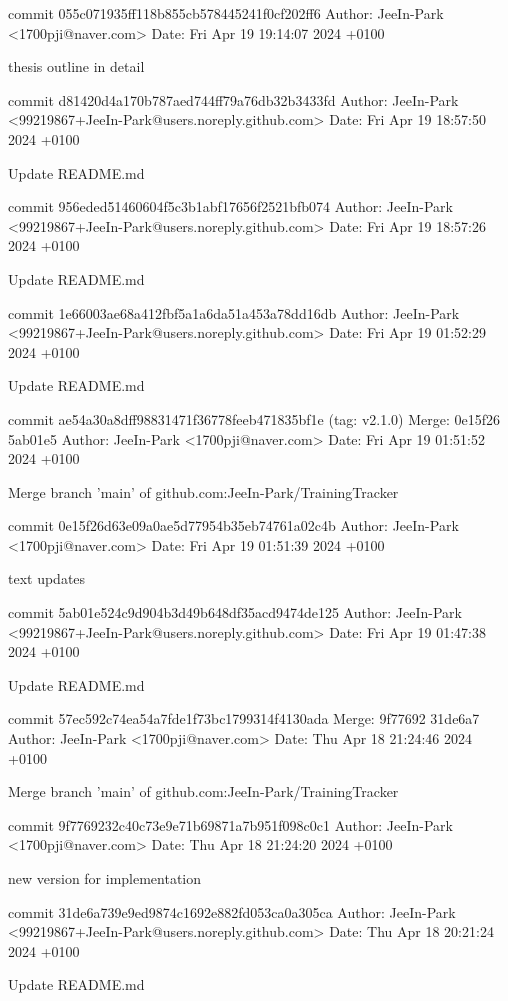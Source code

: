 

commit 055c071935ff118b855cb578445241f0cf202ff6
Author: JeeIn-Park <1700pji@naver.com>
Date:   Fri Apr 19 19:14:07 2024 +0100

    thesis outline in detail

commit d81420d4a170b787aed744ff79a76db32b3433fd
Author: JeeIn-Park <99219867+JeeIn-Park@users.noreply.github.com>
Date:   Fri Apr 19 18:57:50 2024 +0100

    Update README.md

commit 956eded51460604f5c3b1abf17656f2521bfb074
Author: JeeIn-Park <99219867+JeeIn-Park@users.noreply.github.com>
Date:   Fri Apr 19 18:57:26 2024 +0100

    Update README.md

commit 1e66003ae68a412fbf5a1a6da51a453a78dd16db
Author: JeeIn-Park <99219867+JeeIn-Park@users.noreply.github.com>
Date:   Fri Apr 19 01:52:29 2024 +0100

    Update README.md

commit ae54a30a8dff98831471f36778feeb471835bf1e (tag: v2.1.0)
Merge: 0e15f26 5ab01e5
Author: JeeIn-Park <1700pji@naver.com>
Date:   Fri Apr 19 01:51:52 2024 +0100

    Merge branch 'main' of github.com:JeeIn-Park/TrainingTracker

commit 0e15f26d63e09a0ae5d77954b35eb74761a02c4b
Author: JeeIn-Park <1700pji@naver.com>
Date:   Fri Apr 19 01:51:39 2024 +0100

    text updates

commit 5ab01e524c9d904b3d49b648df35acd9474de125
Author: JeeIn-Park <99219867+JeeIn-Park@users.noreply.github.com>
Date:   Fri Apr 19 01:47:38 2024 +0100

    Update README.md

commit 57ec592c74ea54a7fde1f73bc1799314f4130ada
Merge: 9f77692 31de6a7
Author: JeeIn-Park <1700pji@naver.com>
Date:   Thu Apr 18 21:24:46 2024 +0100

    Merge branch 'main' of github.com:JeeIn-Park/TrainingTracker

commit 9f7769232c40c73e9e71b69871a7b951f098c0c1
Author: JeeIn-Park <1700pji@naver.com>
Date:   Thu Apr 18 21:24:20 2024 +0100

    new version for implementation

commit 31de6a739e9ed9874c1692e882fd053ca0a305ca
Author: JeeIn-Park <99219867+JeeIn-Park@users.noreply.github.com>
Date:   Thu Apr 18 20:21:24 2024 +0100

    Update README.md

